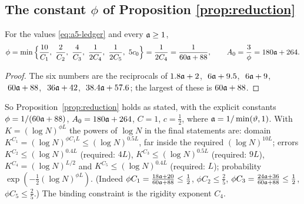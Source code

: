 \subsection{The constant \texorpdfstring{$\phi$}{phi} of Proposition \ref{prop:reduction}}\label{app:phi}
\begin{lemma}\label{lem:phi}
For the values \eqref{eq:a5-ledger} and every $\mathfrak{a}\ge1$,
\[
 \phi=\min\Big\{\frac{10}{C_1},\ \frac{2}{C_2},\ \frac{4}{C_3},\ \frac1{2C_4},\ \frac1{2C_5},\ 5c_0\Big\}=\frac1{2C_4}=\frac1{60\fa+88},\qquad A_0=\frac3\phi=180\fa+264 .
\]
\end{lemma}
\begin{proof}
The six numbers are the reciprocals of $1.8\mathfrak{a}+2$, $\ 6\fa+9.5$, $\ 6\mathfrak{a}+9$, $\ 60\mathfrak{a}+88$, $\ 36\fa+42$, $\ 38.4\mathfrak{a}+57.6$; the largest of these is $60\mathfrak{a}+88$.
\end{proof}
\noindent So Proposition~\ref{prop:reduction} holds as stated, with the explicit constants $\phi=1/(60\mathfrak{a}+88)$, $A_0=180\mathfrak{a}+264$, $C=1$, $c=\frac12$, where $\mathfrak{a}=1/\min(\vartheta,1)$. With $K=(\log N)^{\phi L}$ the powers of $\log N$ in the final statements are:
domain $K^{C_1}=(\log N)^{\phi C_1L}\le(\log N)^{0.5L}$, far inside the required $(\log N)^{10L}$; errors $K^{C_2}\le(\log N)^{0.4L}$ (required: $4L$), $K^{C_3}\le(\log N)^{0.5L}$ (required: $9L$), $K^{C_4}=(\log N)^{L/2}$ and $K^{C_5}\le(\log N)^{0.4L}$ (required: $L$);
probability $\exp(-\frac12(\log N)^{\phi L})$. (Indeed $\phi C_1=\frac{18\mathfrak{a}+20}{60\mathfrak{a}+88}\le\frac12$, $\phi C_2\le\frac25$, $\phi C_3=\frac{24\mathfrak{a}+36}{60\mathfrak{a}+88}\le\frac12$, $\phi C_5\le\frac25$.) The binding constraint is the rigidity exponent $C_4$.

